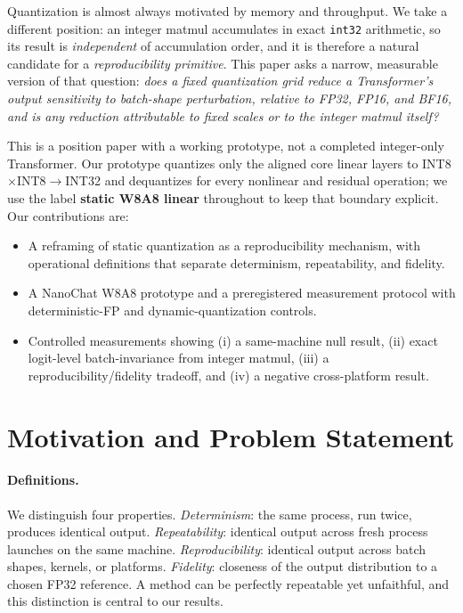\documentclass[10pt,twocolumn]{article}
\begin{document}
Quantization is almost always motivated by memory and throughput. We take a
different position: an integer matmul accumulates in exact \texttt{int32}
arithmetic, so its result is \emph{independent} of accumulation order, and it is
therefore a natural candidate for a \emph{reproducibility primitive}. This paper
asks a narrow, measurable version of that question: \emph{does a fixed
quantization grid reduce a Transformer's output sensitivity to batch-shape
perturbation, relative to FP32, FP16, and BF16, and is any reduction attributable
to fixed scales or to the integer matmul itself?}

This is a position paper with a working prototype, not a completed integer-only
Transformer. Our prototype quantizes only the aligned core linear layers to
INT8$\times$INT8$\rightarrow$INT32 and dequantizes for every nonlinear and
residual operation; we use the label \textbf{static W8A8 linear} throughout to
keep that boundary explicit. Our contributions are:
\begin{itemize}\itemsep2pt
  \item A reframing of static quantization as a reproducibility mechanism, with
  operational definitions that separate determinism, repeatability, and fidelity.
  \item A NanoChat W8A8 prototype and a preregistered measurement protocol with
  deterministic-FP and dynamic-quantization controls.
  \item Controlled measurements showing (i) a same-machine null result, (ii)
  exact logit-level batch-invariance from integer matmul, (iii) a
  reproducibility/fidelity tradeoff, and (iv) a negative cross-platform result.
\end{itemize}

\section{Motivation and Problem Statement}
\paragraph{Definitions.} We distinguish four properties. \emph{Determinism}: the
same process, run twice, produces identical output. \emph{Repeatability}:
identical output across fresh process launches on the same machine.
\emph{Reproducibility}: identical output across batch shapes, kernels, or
platforms. \emph{Fidelity}: closeness of the output distribution to a chosen
FP32 reference. A method can be perfectly repeatable yet unfaithful, and this
distinction is central to our results.
\end{document}
